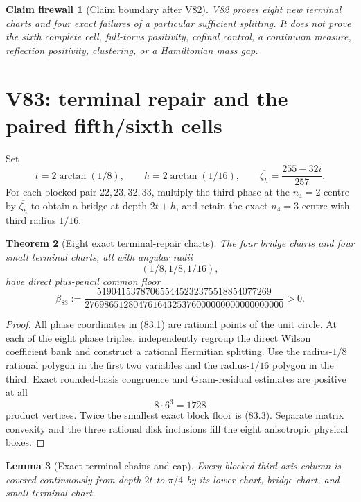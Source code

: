 \documentclass[11pt,oneside]{article}
\newtheorem{theorem}{Theorem}[section]
\newtheorem{lemma}[theorem]{Lemma}
\newtheorem{firewall}[theorem]{Claim firewall}
\theoremstyle{definition}
\theoremstyle{remark}
\begin{document}
\begin{firewall}[Claim boundary after V82]
\label{fire:newv82-final}
V82 proves eight new terminal charts and four exact failures of a
particular sufficient splitting.  It does not prove the sixth
complete cell, full-torus positivity, cofinal control, a continuum
measure, reflection positivity, clustering, or a Hamiltonian mass
gap.
\end{firewall}

\section{V83: terminal repair and the paired fifth/sixth cells}
\label{sec:newv83-sixth-cell}

Set
\[
 t=2\arctan(1/8),\qquad h=2\arctan(1/16),\qquad
 \overline{\zeta_h}=\frac{255-32i}{257}.               \tag{83.1}
\]
For each blocked pair \(22,23,32,33\), multiply the third phase at
the \(n_4=2\) centre by \(\overline{\zeta_h}\) to obtain a bridge
at depth \(2t+h\), and retain the exact \(n_4=3\) centre with third
radius \(1/16\).

\begin{theorem}[Eight exact terminal-repair charts]
\label{thm:newv83-repair}
The four bridge charts and four small terminal charts, all with
angular radii
\[
 (1/8,1/8,1/16),                                      \tag{83.2}
\]
have direct plus-pencil common floor
\[
\beta_{83}:=
\frac{519041537870655445232375518854077269}
     {27698651280476164325376000000000000000000}>0.    \tag{83.3}
\]
\end{theorem}

\begin{proof}
All phase coordinates in (83.1) are rational points of the unit
circle.  At each of the eight phase triples, independently regroup
the direct Wilson coefficient bank and construct a rational
Hermitian splitting.  Use the radius-\(1/8\) rational polygon in
the first two variables and the radius-\(1/16\) polygon in the
third.  Exact rounded-basis congruence and Gram-residual estimates
are positive at all
\[
 8\cdot6^3=1728                                        \tag{83.4}
\]
product vertices.  Twice the smallest exact block floor is (83.3).
Separate matrix convexity and the three rational disk inclusions
fill the eight anisotropic physical boxes.
\end{proof}

\begin{lemma}[Exact terminal chains and cap]
\label{lem:newv83-terminal-chains}
Every blocked third-axis column is covered continuously from depth
\(2t\) to \(\pi/4\) by its lower chart, bridge chart, and small
terminal chart.
\end{lemma}
\end{document}
